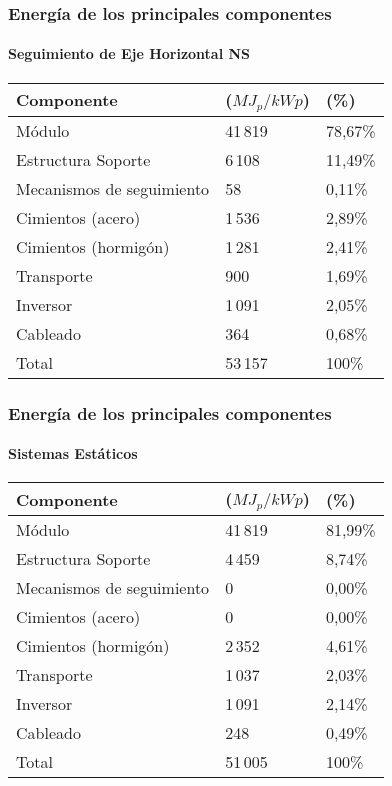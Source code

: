 \documentclass[xcolor=dvipsnames]{beamer}
\begin{document}
\begin{frame}
  \frametitle{Energía de los principales componentes}
  \framesubtitle{Seguimiento de Eje Horizontal NS}
  \begin{tabular}{lll}
    \toprule
    Componente              &  ($MJ_{p}/kWp$)  &  (\%)     \\
    \midrule
    Módulo & 41\,819 & 78,67\% \\
    Estructura Soporte      &  6\,108          &  11,49\%  \\
    Mecanismos de seguimiento    &  58              &  0,11\%   \\
    Cimientos (acero)     &  1\,536          &  2,89\%   \\
    Cimientos (hormigón)  &  1\,281          &  2,41\%   \\
    Transporte              &  900             &  1,69\%   \\
    Inversor               &  1\,091          &  2,05\%   \\
    Cableado                 &  364             &  0,68\%   \\
    \midrule
    Total                  &  53\,157         &  100\%    \\
    \bottomrule
  \end{tabular}
\end{frame}

\begin{frame}
  \frametitle{Energía de los principales componentes}
  \framesubtitle{Sistemas Estáticos}
  \begin{tabular}{lll}
    \toprule
    Componente              &  ($MJ_{p}/kWp$)  &  (\%)    \\
    \midrule
    Módulo & 41\,819 & 81,99\% \\
    Estructura Soporte      &  4\,459          &  8,74\%  \\
    Mecanismos de seguimiento    &  0               &  0,00\%  \\
    Cimientos (acero)     &  0               &  0,00\%  \\
    Cimientos (hormigón)  &  2\,352          &  4,61\%  \\
    Transporte              &  1\,037          &  2,03\%  \\
    Inversor               &  1\,091          &  2,14\%  \\
    Cableado                 &  248             &  0,49\%  \\
    \midrule
    Total                  &  51\,005         &  100\%   \\
    \bottomrule
  \end{tabular}
\end{frame}
\end{document}
